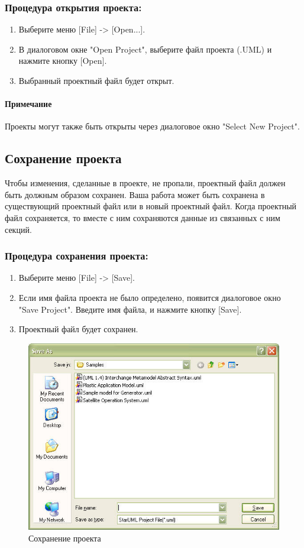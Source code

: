 \documentclass[a4paper,12pt]{report}
\begin{document}
\subsubsection*{Процедура открытия проекта:}
\begin{enumerate}
	\item Выберите меню [File] -> [Open...].
	\item В диалоговом окне "Open Project", выберите файл проекта (.UML) и нажмите кнопку
	[Open].
	\item Выбранный проектный файл будет открыт.
\end{enumerate}

\paragraph{Примечание}
Проекты могут также быть открыты через диалоговое окно "Select New Project".

\subsection*{Сохранение проекта}
Чтобы изменения, сделанные в проекте, не пропали, проектный файл должен быть должным
образом сохранен. Ваша работа может быть сохранена в существующий проектный файл или в 
новый проектный файл. Когда проектный файл сохраняется, то вместе с ним сохраняются данные
из связанных с ним секций.
\subsubsection*{Процедура сохранения проекта:}
\begin{enumerate}
	\item Выберите меню [File] -> [Save].
	\item Если имя файла проекта не было определено, появится диалоговое окно "Save Project".
	Введите имя файла, и нажмите кнопку [Save].
	\item Проектный файл будет сохранен.
\end{enumerate}
\begin{figure}[h!]
	\centering
	\includegraphics[width=0.7\linewidth]{images/saveproject}
	\caption{Сохранение проекта}
	\label{fig:saveproject}
\end{figure}
\end{document}
